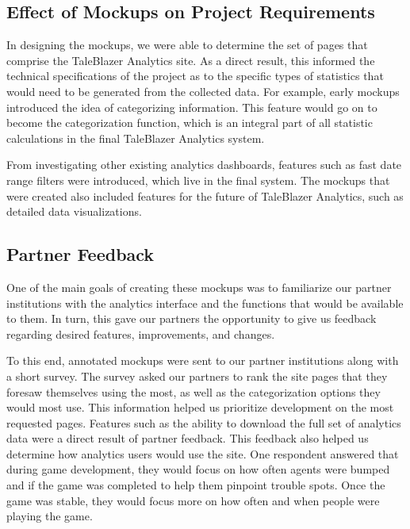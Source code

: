 \subsection{Effect of Mockups on Project Requirements}

In designing the mockups, we were able to determine the set of pages that comprise the TaleBlazer Analytics site. As a direct result, this informed the technical specifications of the project as to the specific types of statistics that would need to be generated from the collected data. For example, early mockups introduced the idea of categorizing information. This feature would go on to become the categorization function, which is an integral part of all statistic calculations in the final TaleBlazer Analytics system. 

From investigating other existing analytics dashboards, features such as fast date range filters were introduced, which live in the final system. The mockups that were created also included features for the future of TaleBlazer Analytics, such as detailed data visualizations. 

\subsection{Partner Feedback}

One of the main goals of creating these mockups was to familiarize our partner institutions with the analytics interface and the functions that would be available to them. In turn, this gave our partners the opportunity to give us feedback regarding desired features, improvements, and changes.

To this end, annotated mockups were sent to our partner institutions along with a short survey. The survey asked our partners to rank the site pages that they foresaw themselves using the most, as well as the categorization options they would most use. This information helped us prioritize development on the most requested pages. Features such as the ability to download the full set of analytics data were a direct result of partner feedback. This feedback also helped us determine how analytics users would use the site. One respondent answered that during game development, they would focus on how often agents were bumped and if the game was completed to help them pinpoint trouble spots. Once the game was stable, they would focus more on how often and when people were playing the game.





